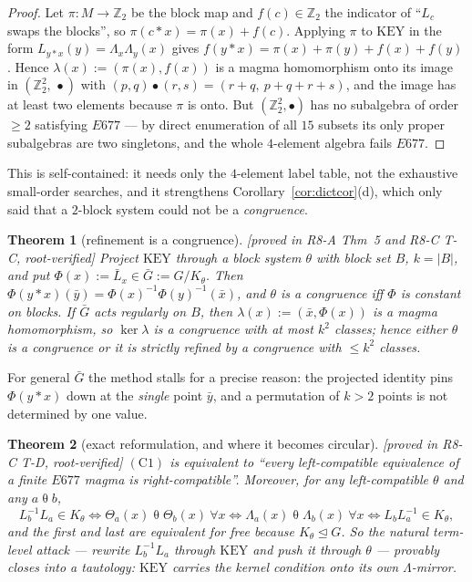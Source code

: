 \documentclass[11pt]{article}
\theoremstyle{plain}
\newtheorem{theorem}{Theorem}[section]
\theoremstyle{definition}
\theoremstyle{remark}
\numberwithin{equation}{section}
\newcommand{\Z}{\mathbb{Z}}
\newcommand{\op}{\mathbin{*}}
\newcommand{\statusbox}[1]{{\small\sloppy\textsf{[#1]}}}
\newcommand{\PROVED}[1]{\statusbox{proved in #1, root-verified}}
\begin{document}
\begin{proof}
Let $\pi : M\to\Z_2$ be the block map and $f(c)\in\Z_2$ the indicator of ``$L_c$
swaps the blocks'', so $\pi(c\op x) = \pi(x)+f(c)$. Applying $\pi$ to
$\mathrm{KEY}$ in the form $L_{y\op x}(y) = \Lambda_x\Lambda_y(x)$ gives
$f(y\op x) = \pi(x)+\pi(y)+f(x)+f(y)$. Hence $\lambda(x) := (\pi(x),f(x))$ is a
magma homomorphism onto its image in $(\Z_2^2,\,\bullet)$ with
$(p,q)\bullet(r,s) = (r+q,\ p+q+r+s)$, and the image has at least two elements
because $\pi$ is onto. But $(\Z_2^2,\bullet)$ has no subalgebra of order $\ge2$
satisfying $E677$ --- by direct enumeration of all $15$ subsets its only proper
subalgebras are two singletons, and the whole $4$-element algebra fails $E677$.
\end{proof}

This is self-contained: it needs only the $4$-element label table, not the
exhaustive small-order searches, and it strengthens
Corollary~\ref{cor:dictcor}(d), which only said that a $2$-block system could not
be a \emph{congruence}.

\begin{theorem}[refinement is a congruence]\label{thm:refine}
\PROVED{R8-A Thm~5 and R8-C T-C}
Project $\mathrm{KEY}$ through a block system $\theta$ with block set $B$,
$k = |B|$, and put $\Phi(x) := \bar L_x\in\bar G := G/K_\theta$. Then
$\Phi(y\op x)(\bar y) = \Phi(x)^{-1}\Phi(y)^{-1}(\bar x)$, and $\theta$ is a
congruence iff $\Phi$ is constant on blocks. If $\bar G$ acts \emph{regularly} on
$B$, then $\lambda(x) := (\bar x,\Phi(x))$ is a magma homomorphism, so
$\ker\lambda$ is a \emph{congruence} with at most $k^2$ classes; hence either
$\theta$ is a congruence or it is strictly refined by a congruence with $\le k^2$
classes.
\end{theorem}

For general $\bar G$ the method stalls for a precise reason: the projected
identity pins $\Phi(y\op x)$ down at the \emph{single} point $\bar y$, and a
permutation of $k>2$ points is not determined by one value.

\begin{theorem}[exact reformulation, and where it becomes circular]\label{thm:C1circ}
\PROVED{R8-C T-D}
$(\mathrm{C1})$ is equivalent to ``every left-compatible equivalence of a finite
$E677$ magma is right-compatible''. Moreover, for any left-compatible $\theta$ and
any $a\mathrel\theta b$,
\[
  L_b^{-1}L_a\in K_\theta
  \iff \Theta_a(x)\mathrel\theta\Theta_b(x)\ \forall x
  \iff \Lambda_a(x)\mathrel\theta\Lambda_b(x)\ \forall x
  \iff L_bL_a^{-1}\in K_\theta,
\]
and the first and last are equivalent for free because $K_\theta\trianglelefteq G$.
So the natural term-level attack --- rewrite $L_b^{-1}L_a$ through $\mathrm{KEY}$
and push it through $\theta$ --- \emph{provably closes into a tautology}:
$\mathrm{KEY}$ carries the kernel condition onto its own $\Lambda$-mirror.
\end{theorem}
\end{document}
